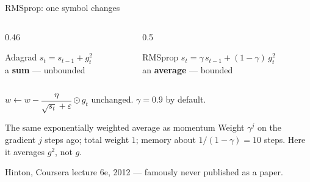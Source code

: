 \documentclass[aspectratio=169]{beamer}
\begin{document}
\begin{frame}[shrink=12]{RMSprop: one symbol changes}
  \begin{columns}[T]
    \begin{column}{0.46\textwidth}
      \begin{block}{Adagrad}
        \centering
        $s_t = s_{t-1} + g_t^2$\\[0.3em]
        {\small a \textbf{sum} --- unbounded}
      \end{block}
    \end{column}
    \begin{column}{0.5\textwidth}
      \begin{exampleblock}{RMSprop}
        \centering
        $s_t = \gamma\, s_{t-1} + (1-\gamma)\, g_t^2$\\[0.3em]
        {\small an \textbf{average} --- bounded}
      \end{exampleblock}
    \end{column}
  \end{columns}
  \vspace{0.6em}
  \begin{center}
    $w \leftarrow w - \dfrac{\eta}{\sqrt{s_t}+\varepsilon}\odot g_t$
    \qquad unchanged. \quad $\gamma = 0.9$ by default.
  \end{center}
  \vspace{0.5em}
  \begin{alertblock}{The same exponentially weighted average as momentum}
    Weight $\gamma^j$ on the gradient $j$ steps ago; total weight $1$; memory
    about $1/(1-\gamma) = 10$ steps. Here it averages $g^2$, not $g$.
  \end{alertblock}
  \vspace{0.2em}
  \begin{center}\small
    Hinton, Coursera lecture 6e, 2012 --- famously never published as a paper.
  \end{center}
\end{frame}
\end{document}
